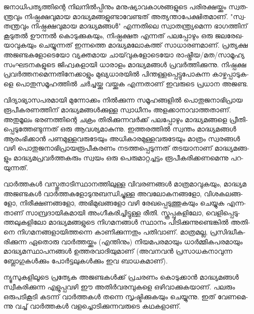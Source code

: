 \vskip 2pt

ജ­നാ­ധി­പ­ത്യ­ത്തി­ന്റെ നി­ല­നില്‍­പ്പി­നും മനു­ഷ്യാ­വ­കാ­ശ­ങ്ങ­ളു­ടെ പരി­ര­ക്ഷ­യ്ക്കും സ്വ­ത­ന്ത്ര­വും നി­ഷ്പ­ക്ഷ­വു­മായ 
മാ­ദ്ധ്യ­മ­ങ്ങ­ളു­ണ്ടാ­വേ­ണ്ട­ത് അത്യ­ന്താ­പേ­ക്ഷി­ത­മാ­ണ്. "സ്വ­ത­ന്ത്ര­വും നി­ഷ്പ­ക്ഷ­വു­മായ മാ­ദ്ധ്യ­മ­ങ്ങള്‍" എന്ന­തി­ലെ 
സ്വാ­ത­ന്ത്ര്യ­മെ­ന്ന ഭാ­ഗ­ത്തി­ന് കൂ­ടു­തല്‍ ഊന്നല്‍ കൊ­ടു­ക്കു­ക­യും, നി­ഷ്പ­ക്ഷത എന്ന­ത് പല­പ്പോ­ഴും ഒരു ജല­രേ­ഖ­യാ­വു­ക­യും 
ചെ­യ്യു­ന്ന­ത് ഇന്ന­ത്തെ മാ­ദ്ധ്യ­മ­ലോ­ക­ത്ത് സാ­ധാ­ര­ണ­മാ­ണ്. പ്ര­ത്യ­ക്ഷ അജ­ണ്ട­ക­ളോ­ടെ­യോ വ്യ­ക്ത­മായ 
ചാ­യ്‌­വു­ക­ളോ­ടെ­യോ രാ­ഷ്ട്രീ­യ/­മ­ത/­സാ­മൂ­ഹ്യ സം­ഘ­ട­ന­ക­ളു­ടെ ജി­ഹ്വ­ക­ളാ­യി ധാ­രാ­ളം മാ­ദ്ധ്യ­മ­ങ്ങള്‍ പ്ര­വര്‍­ത്തി­ക്കു­ന്നു. 
നി­ഷ്പ­ക്ഷ പ്ര­വര്‍­ത്ത­ന­മെ­ന്ന­തി­നേ­ക്കാ­ളും മു­ഖ്യ­ധാ­ര­യില്‍ പി­ന്ത­ള്ള­പ്പെ­ട്ടു­പോ­കു­ന്ന കാ­ഴ്ച­പ്പാ­ടു­ക­ളെ പൊ­തു­സ­മൂ­ഹ­ത്തില്‍ 
ചര്‍­ച്ച­യ്ക്കു വയ്ക്കുക എന്ന­താ­ണ് ഇവ­രു­ടെ പ്ര­ധാന അ­ജ­ണ്ട.

­വി­ദ്യാ­ഭ്യാ­സ­പ­ര­മാ­യി മു­ന്നോ­ക്കം നില്‍­ക്കു­ന്ന സമൂ­ഹ­ങ്ങ­ളില്‍ പൊ­തു­ജ­നാ­ഭി­പ്രായ രൂ­പീ­ക­ര­ണ­ത്തി­ന് മാ­ദ്ധ്യ­മ­ങ്ങള്‍­ക്കു­ള്ള 
സ്വാ­ധീ­നം അള­ക്കാ­നാ­വാ­ത്ത­താ­ണ്. അതു­മൂ­ലം ഭര­ണ­ത്തി­ന്റെ ചക്രം തി­രി­ക്കു­ന്ന­വര്‍­ക്ക് പല­പ്പോ­ഴും മാ­ദ്ധ്യ­മ­ങ്ങ­ളെ 
പ്രീ­തി­പ്പെ­ടു­ത്തേ­ണ്ടു­ന്ന­ത് ഒരു ആവ­ശ്യ­മാ­കു­ന്നു. ഇത്ത­ര­ത്തില്‍ സ്വ­ന്തം മാ­ദ്ധ്യ­മ­ങ്ങള്‍ ആരം­ഭി­ക്കാന്‍ പണ­മു­ള്ള­വ­രു­ടേ­യും 
അധി­കാ­ര­മു­ള്ള­വ­രു­ടേ­യും മാ­ത്രം സ്വ­ര­ങ്ങള്‍ വഴി പൊ­തു­ജ­നാ­ഭി­പ്രാ­യ­രൂ­പീ­ക­ര­ണം നട­ത്ത­പ്പെ­ടു­ന്ന­ത് തട­യാ­നാ­ണ് 
മാ­ദ്ധ്യ­മ­ങ്ങ­ളും മാ­ദ്ധ്യ­മ­പ്ര­വര്‍­ത്ത­ക­രും സ്വ­യം ഒരു പെ­രു­മാ­റ്റ­ച്ച­ട്ടം രൂ­പീ­ക­രി­ക്ക­ണ­മെ­ന്നു പറ­യു­ന്ന­ത്.

­വാര്‍­ത്ത­കള്‍ വസ്തു­താ­ടി­സ്ഥാ­ന­ത്തി­ലു­ള്ള ­വി­വ­ര­ണ­ങ്ങള്‍ മാ­ത്ര­മാ­വു­ക­യും, മാ­ദ്ധ്യമ അജ­ണ്ട­കള്‍ 
വാര്‍­ത്ത­ക­ളോ­ടു­നു­ബ­ന്ധി­ച്ചു­ള്ള അവ­ലോ­ക­ന­ങ്ങ­ളോ, വി­ശ­ക­ല­ങ്ങ­ളോ, നി­രീ­ക്ഷ­ണ­ങ്ങ­ളോ, അഭി­മു­ഖ­ങ്ങ­ളോ വഴി 
രേ­ഖ­പ്പെ­ടു­ത്തു­ക­യും ചെ­യ്യുക എന്ന­താ­ണ് സാ­മ്പ്ര­ദാ­യി­ക­മാ­യി അം­ഗീ­ക­രി­ച്ചി­ട്ടു­ള്ള രീ­തി. സ്കൂ­പ്പു­ക­ളി­ലോ, 
വെ­ളി­പ്പെ­ടു­ത്ത­ലു­ക­ളി­ലോ മാ­ദ്ധ്യ­മ­ങ്ങ­ളു­ടെ നി­ഗ­മ­ന­ങ്ങള്‍ സ്ഥാ­നം പി­ടി­ക്കു­ന്നു­ണ്ടെ­ങ്കില്‍ അതി­നെ നി­ഗ­മ­ന­ങ്ങ­ളാ­യി­ത്ത­ന്നെ 
കാ­ണി­ക്കു­ന്ന­തും പതി­വാ­ണ്. മാ­ത്ര­മ­ല്ല, പ്ര­സി­ദ്ധീ­ക­രി­ക്കു­ന്ന ഏതൊ­രു വാര്‍­ത്ത­യ്ക്കും (എ­ന്തി­നും) നി­യ­മ­പ­ര­മാ­യും 
ധാര്‍­മ്മി­ക­പ­ര­മാ­യും മാ­ദ്ധ്യ­മ­സ്ഥാ­പ­ന­ങ്ങള്‍ ഉത്ത­ര­വാ­ദി­യു­മാ­ണ് (അ­വ­ന­വന്‍ പ്ര­സാ­ധ­ക­നാ­വു­ന്ന ബ്ലോ­ഗു­കള്‍­ക്കും 
പോര്‍­ട്ട­ലു­കള്‍­ക്കും ഇവ ബാ­ധ­ക­മാ­ണ്).

­ന്യൂ­സു­ക­ളി­ലൂ­ടെ പ്ര­ത്യേക അജ­ണ്ട­കള്‍­ക്ക് പ്ര­ച­ര­ണം കൊ­ടു­ക്കാന്‍ മാ­ദ്ധ്യ­മ­ങ്ങള്‍ സ്വീ­ക­രി­ക്കു­ന്ന എളു­പ്പ­വ­ഴി ഈ 
അതിര്‍­വ­ര­മ്പു­ക­ളെ ഒഴി­വാ­ക്കു­ക­യാ­ണ്. പല­രും ഒരു­പ­ടി­കൂ­ടി കട­ന്ന് വാര്‍­ത്ത­കള്‍ തന്നെ സൃ­ഷ്ടി­ക്കു­ക­യും ചെ­യ്യു­ന്നു. ഇത് 
വേ­ണ­മെ­ന്നു വച്ച് വാര്‍­ത്ത­കള്‍ വള­ച്ചൊ­ടി­ക്കു­ന്ന­വ­രു­ടെ കഥ­ക­ളാ­ണ്.


